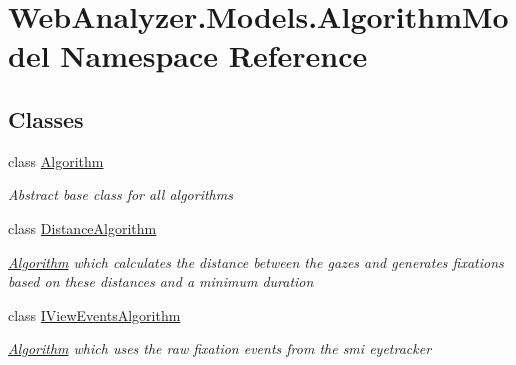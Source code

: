 \hypertarget{namespace_web_analyzer_1_1_models_1_1_algorithm_model}{}\section{Web\+Analyzer.\+Models.\+Algorithm\+Model Namespace Reference}
\label{namespace_web_analyzer_1_1_models_1_1_algorithm_model}
\subsection*{Classes}
\begin{DoxyCompactItemize}
\item 
class \hyperlink{class_web_analyzer_1_1_models_1_1_algorithm_model_1_1_algorithm}{Algorithm}
\begin{DoxyCompactList}\small\item\em Abstract base class for all algorithms \end{DoxyCompactList}\item 
class \hyperlink{class_web_analyzer_1_1_models_1_1_algorithm_model_1_1_distance_algorithm}{Distance\+Algorithm}
\begin{DoxyCompactList}\small\item\em \hyperlink{class_web_analyzer_1_1_models_1_1_algorithm_model_1_1_algorithm}{Algorithm} which calculates the distance between the gazes and generates fixations based on these distances and a minimum duration \end{DoxyCompactList}\item 
class \hyperlink{class_web_analyzer_1_1_models_1_1_algorithm_model_1_1_i_view_events_algorithm}{I\+View\+Events\+Algorithm}
\begin{DoxyCompactList}\small\item\em \hyperlink{class_web_analyzer_1_1_models_1_1_algorithm_model_1_1_algorithm}{Algorithm} which uses the raw fixation events from the smi eyetracker \end{DoxyCompactList}\end{DoxyCompactItemize}
